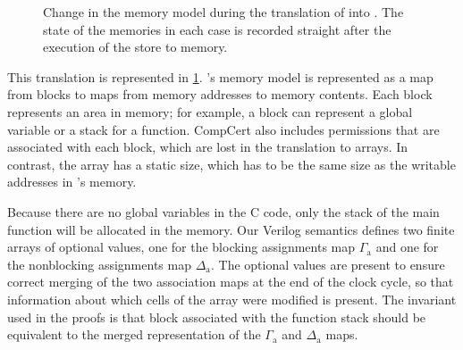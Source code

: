 \begin{figure}
  \caption[Change in the memory model during the translation of \textsc{Rtl}
  into \textsc{Htl}.]{Change in the memory model during the translation of
    \rtl{} into \htl{}.  The state of the memories in each case is recorded
    straight after the execution of the store to
    memory.}\label{fig:memory_model_transl}
\end{figure}

This translation is represented in \cref{fig:memory_model_transl}.
\compcert{}'s memory model is represented as a map from blocks to maps from
memory addresses to memory contents.  Each block represents an area in memory;
for example, a block can represent a global variable or a stack for a function.
CompCert also includes permissions that are associated with each block, which
are lost in the translation to arrays.  In contrast, the array has a static
size, which has to be the same size as the writable addresses in \compcert{}'s
memory.

Because there are no global variables in the C code, only the stack of the main
function will be allocated in the memory.  Our Verilog semantics defines two
finite arrays of optional values, one for the blocking assignments map
$\Gamma_{\mathrm{a}}$ and one for the nonblocking assignments map
$\Delta_{\mathrm{a}}$.  The optional values are present to ensure correct
merging of the two association maps at the end of the clock cycle, so that
information about which cells of the array were modified is present.  The
invariant used in the proofs is that block associated with the function stack
should be equivalent to the merged representation of the $\Gamma_{\mathrm{a}}$
and $\Delta_{\mathrm{a}}$ maps.

